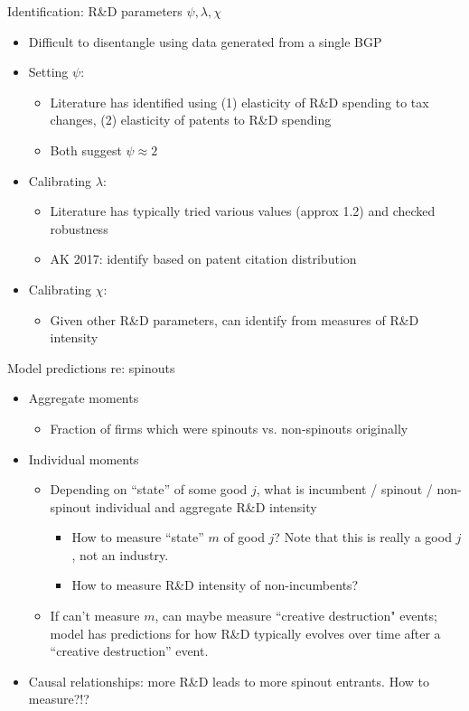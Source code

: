 \documentclass[english,usenames,dvipsnames]{beamer}
\begin{document}
\begin{frame}{Identification: R\&D parameters $\psi, \lambda, \chi$}
\begin{itemize}
\item Difficult to disentangle using data generated from a single BGP 
\item Setting $\psi$:
\begin{itemize}
	\item Literature has identified using (1) elasticity of R\&D spending to tax changes, (2) elasticity of patents to R\&D spending
	\item Both suggest $\psi \approx 2$
\end{itemize}
\item Calibrating $\lambda$:
\begin{itemize}
	\item Literature has typically tried various values (approx 1.2) and checked robustness
	\item AK 2017: identify based on patent citation distribution
\end{itemize}
\item Calibrating $\chi$:
\begin{itemize}
	\item Given other R\&D parameters, can identify from measures of R\&D intensity  
\end{itemize}
\end{itemize}
\end{frame}

\begin{frame}{Model predictions re: spinouts}
\begin{itemize}
	\item Aggregate moments
	\begin{itemize}
		\item Fraction of firms which were spinouts vs. non-spinouts originally
	\end{itemize}
	\item Individual moments
	\begin{itemize}
		\item Depending on ``state'' of some good $j$, what is incumbent / spinout / non-spinout individual and aggregate R\&D intensity
		\begin{itemize}
			\item How to measure ``state'' $m$ of good $j$? Note that this is really a good $j$, not an industry.
			\item How to measure R\&D intensity of non-incumbents?
		\end{itemize}
 		\item If can't measure $m$, can maybe measure ``creative destruction" events; model has predictions for how R\&D typically evolves over time after a ``creative destruction'' event.
	\end{itemize}
	\item Causal relationships: more R\&D leads to more spinout entrants. How to measure?!?
\end{itemize}
\end{frame}
\end{document}
